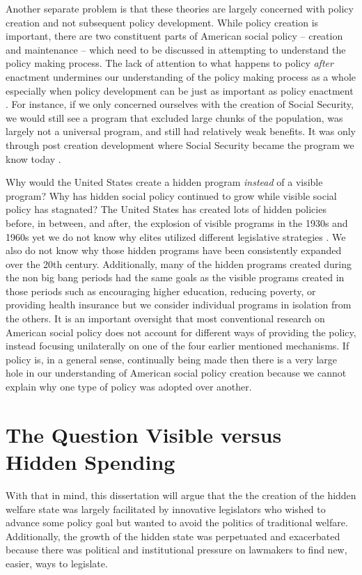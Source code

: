 \documentclass[12pt]{article}
\begin{document}
Another separate problem is that these theories are largely concerned with policy creation and not subsequent policy development. While policy creation is important, there are two constituent parts of American social policy -- creation and maintenance -- which need to be discussed in attempting to understand the policy making process. The lack of attention to what happens to policy \emph{after} enactment undermines our understanding of the policy making process as a whole especially when policy development can be just as important as policy enactment \citep{patashnik2008}. For instance, if we only concerned ourselves with the creation of Social Security, we would still see a program that excluded large chunks of the population, was largely not a universal program, and still had relatively weak benefits. It was only through post creation development where Social Security became the program we know today \citep{derthick1979}.

Why would the United States create a hidden program \emph{instead} of a visible program? Why has hidden social policy continued to grow while visible social policy has stagnated? The United States has created lots of hidden policies before, in between, and after, the explosion of visible programs in the 1930s and 1960s yet we do not know why elites utilized different legislative strategies \citep[Ch. 2]{howard2008}. We also do not know why those hidden programs have been consistently expanded over the 20th century. Additionally, many of the hidden programs created during the non big bang periods had the same goals as the visible programs created in those periods such as encouraging higher education, reducing poverty, or providing health insurance but we consider individual programs in isolation from the others. It is an important oversight that most conventional research on American social policy does not account for different ways of providing the policy, instead focusing unilaterally on one of the four earlier mentioned mechanisms. If policy is, in a general sense, continually being made then there is a very large hole in our understanding of American social policy creation because we cannot explain why one type of policy was adopted over another.

\section{The Question Visible versus Hidden Spending}
With that in mind, this dissertation will argue that the the creation of the hidden welfare state was largely facilitated by innovative legislators who wished to advance some policy goal but wanted to avoid the politics of traditional welfare. Additionally, the growth of the hidden state was perpetuated and exacerbated because there was political and institutional pressure on lawmakers to find new, easier, ways to legislate. 
\end{document}
